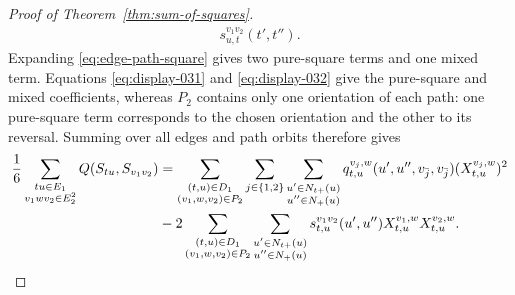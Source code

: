 \documentclass[12pt]{article}
\begin{document}
\begin{proof}[Proof of Theorem~\ref{thm:sum-of-squares}]
\begin{equation}
\begin{aligned}
s_{u,t}^{v_1v_2}(t',t'').
\end{aligned}
\end{equation}
Expanding \eqref{eq:edge-path-square} gives two pure-square terms and one mixed
term.  Equations \eqref{eq:display-031} and \eqref{eq:display-032} give the
pure-square and mixed coefficients, whereas $P_2$
contains only one orientation of each path: one pure-square term corresponds
to the chosen orientation and the other to its reversal.  Summing over all
edges and path orbits therefore gives
\begin{align}
\frac16\sum_{\substack{tu\in E_1\\v_1wv_2\in E_2^2}}
Q(S_{tu},S_{v_1v_2})
&=\sum_{\substack{(t,u)\in D_1\\(v_1,w,v_2)\in P_2}}
\sum_{j\in\{1,2\}}
\sum_{\substack{u'\in N_{t+}(u)\\u''\in N_+(u)}}
q_{t,u}^{v_j,w}(u',u'',v_{\bar j},v_{\bar j})
(X_{t,u}^{v_j,w})^2                                        \notag\\
&-2\sum_{\substack{(t,u)\in D_1\\(v_1,w,v_2)\in P_2}}
\sum_{\substack{u'\in N_{t+}(u)\\u''\in N_+(u)}}
s_{t,u}^{v_1v_2}(u',u'')X_{t,u}^{v_1,w}X_{t,u}^{v_2,w}.
                                                               \label{eq:edge-path}
\end{align}


\end{proof}
\end{document}
